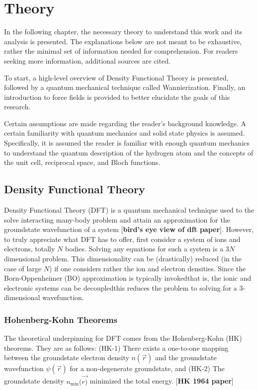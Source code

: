 \chapter{Theory}

In the following chapter, the necessary theory to understand this work and its analysis is presented. The explanations below are not meant to be exhaustive, rather the minimal set of information needed for comprehension. For readers seeking more information, additional sources are cited.

To start, a high-level overview of Density Functional Theory is presented, followed by a quantum mechanical technique called Wannierization. Finally, an introduction to force fields is provided to better elucidate the goals of this research.

Certain assumptions are made regarding the reader's background knowledge. A certain familiarity with quantum mechanics and solid state physics is assumed. Specifically, it is assumed the reader is familiar with enough quantum mechanics to understand the quantum description of the hydrogen atom and the concepts of the unit cell, reciprocal space, and Bloch functions. 

\section{Density Functional Theory}

Density Functional Theory (DFT) is a quantum mechanical technique used to the solve interacting many-body problem and attain an approximation for the groundstate wavefunction of a system [\textbf{bird's eye view of dft paper}]. However, to truly appreciate what DFT has to offer, first consider a system of ions and electrons, totally $N$ bodies. Solving any equations for such a system is a $3N$ dimensional problem. This dimensionality can be (drastically) reduced (in the case of large $N$) if one considers rather the ion and electron densities. Since the Born-Oppenheimer (BO) approximation is typically invoked\textemdash that is, the ionic and electronic systems can be decoupled\textemdash this reduces the problem to solving for a 3-dimensional wavefunction.

    \subsection{Hohenberg-Kohn Theorems} 
    
    The theoretical underpinning for DFT comes from the Hohenberg-Kohn (HK) theorems. They are as follows: (HK-1) There exists a one-to-one mapping between the groundstate electron density $n(\Vec{r})$ and the groundstate wavefunction $\psi (\Vec{r})$ for a non-degenerate groundstate, and (HK-2) The groundstate density $n_\text{min}(\Vec{r)}$ minimized the total energy. [\textbf{HK 1964 paper}]
    
